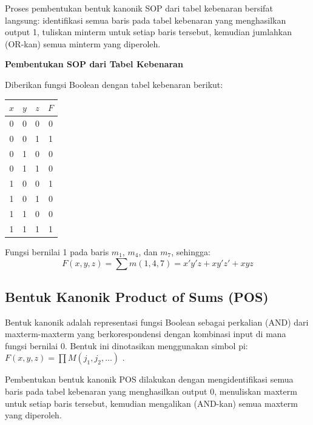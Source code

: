 Proses pembentukan bentuk kanonik SOP dari tabel kebenaran bersifat langsung: identifikasi semua baris pada tabel kebenaran yang menghasilkan output 1, tuliskan minterm untuk setiap baris tersebut, kemudian jumlahkan (OR-kan) semua minterm yang diperoleh.

\begin{contoh}
\textbf{Pembentukan SOP dari Tabel Kebenaran}

Diberikan fungsi Boolean dengan tabel kebenaran berikut:

\begin{center}
\begin{tabular}{|c|c|c||c|}
\hline
$x$ & $y$ & $z$ & $F$ \\ \hline
0 & 0 & 0 & 0 \\ \hline
0 & 0 & 1 & 1 \\ \hline
0 & 1 & 0 & 0 \\ \hline
0 & 1 & 1 & 0 \\ \hline
1 & 0 & 0 & 1 \\ \hline
1 & 0 & 1 & 0 \\ \hline
1 & 1 & 0 & 0 \\ \hline
1 & 1 & 1 & 1 \\ \hline
\end{tabular}
\end{center}

Fungsi bernilai 1 pada baris $m_1$, $m_4$, dan $m_7$, sehingga:
\[ F(x,y,z) = \sum m(1, 4, 7) = x'y'z + xy'z' + xyz \]
\end{contoh}

\subsection{Bentuk Kanonik Product of Sums (POS)}

\begin{definisi}
Bentuk kanonik  adalah representasi fungsi Boolean sebagai perkalian (AND) dari maxterm-maxterm yang berkorespondensi dengan kombinasi input di mana fungsi bernilai 0. Bentuk ini dinotasikan menggunakan simbol pi: $F(x, y, z) = \prod M(j_1, j_2, \ldots)$ \cite{geeksforgeeks_sop_pos}.
\end{definisi}

Pembentukan bentuk kanonik POS dilakukan dengan mengidentifikasi semua baris pada tabel kebenaran yang menghasilkan output 0, menuliskan maxterm untuk setiap baris tersebut, kemudian mengalikan (AND-kan) semua maxterm yang diperoleh.

